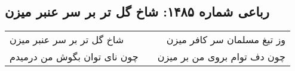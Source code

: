 \begin{center}
\section*{رباعی شماره ۱۴۸۵: شاخ گل تر بر سر عنبر میزن}
\label{sec:1485}
\begin{longtable}{l p{0.5cm} r}
شاخ گل تر بر سر عنبر میزن
&&
وز تیغ مسلمان سر کافر میزن
\\
چون نای توان بگوش من درمیدم
&&
چون دف توام بروی من بر میزن
\\
\end{longtable}
\end{center}
